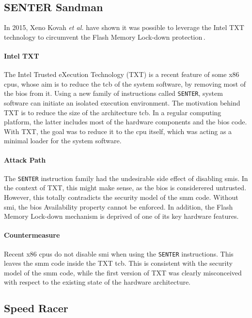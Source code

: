 \subsection{SENTER Sandman}
\label{subsec:usecase:hse:sandman}

In 2015, Xeno Kovah \emph{et al.} have shown it was possible to leverage the
Intel TXT technology to circumvent the Flash Memory Lock-down
protection\,\cite{kovah2015senter}.

\paragraph{Intel TXT}
The Intel Trusted eXecution Technology (TXT) is a recent feature of some x86
\acp{cpu}, whose aim is to reduce the \ac{tcb} of the system software, by
removing most of the \ac{bios} from it.
%
Using a new family of instructions called \texttt{SENTER}, system software can
initiate an isolated execution environment.
%
The motivation behind TXT is to reduce the size of the architecture \ac{tcb}.
%
In a regular computing platform, the latter includes most of the hardware
components and the \ac{bios} code.
%
With TXT, the goal was to reduce it to the \ac{cpu} itself, which was acting as
a minimal loader for the system software.

\paragraph{Attack Path}
%
The \texttt{SENTER} instruction family had the undesirable side effect of
disabling \acp{smi}.
%
In the context of TXT, this might make sense, as the \ac{bios} is considerered
untrusted.
%
However, this totally contradicts the security model of the \ac{smm} code.
%
Without \ac{smi}, the \ac{bios} Availability property cannot be enforced.
%
In addition, the Flash Memory Lock-down mechanism is deprived of one of its key
hardware features.

\paragraph{Countermeasure}
%
Recent x86 \acp{cpu} do not disable \ac{smi} when using the \texttt{SENTER}
instructions.
%
This leaves the \ac{smm} code inside the TXT \ac{tcb}.
%
This is consistent with the security model of the \ac{smm} code, while the first
version of TXT was clearly misconceived with respect to the existing state of
the hardware architecture.

\subsection{Speed Racer}
\label{subsec:usecase:hse:speed}

